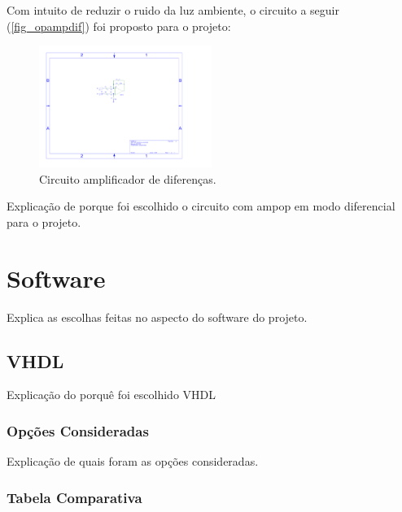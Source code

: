 	Com intuito de reduzir o ruido da luz ambiente, o circuito a seguir (\autoref{fig_opampdif}) foi proposto para o projeto:
	
	\begin{figure}[h!]
		\caption{\label{fig_opampdif}Circuito amplificador de diferenças.}
		\begin{center}
			\includegraphics[width=0.5\textwidth, trim={9.5cm 11.2cm 15cm 5.76cm},clip]{opamp-dif.pdf}
		\end{center}
	\end{figure}
	
	Explicação de porque foi escolhido o circuito com ampop em modo diferencial para o projeto.
	
	\section{Software}\label{sec-software}
	
	Explica as escolhas feitas no aspecto do software do projeto.
	
	\subsection{VHDL}\label{soft-vhdl}
	
	Explicação do porquê foi escolhido VHDL
	
	\subsubsection{Opções Consideradas}\label{vhdl-options}
	
	Explicação de quais foram as opções consideradas.
	
	\subsubsection{Tabela Comparativa}\label{vhdl-table}
	
